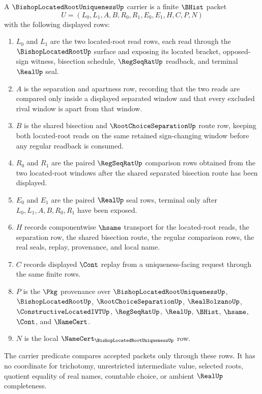 \begin{definition}
\label{def:bishop-located-root-uniqueness-carrier}
A $\BishopLocatedRootUniquenessUp$ carrier is a finite $\BHist$ packet
$$
U=(L_0,L_1,A,B,R_0,R_1,E_0,E_1,H,C,P,N)
$$
with the following displayed rows:
\begin{enumerate}
\item $L_0$ and $L_1$ are the two located-root read rows, each read through the $\BishopLocatedRootUp$ surface and exposing its located bracket, opposed-sign witness, bisection schedule, $\RegSeqRatUp$ readback, and terminal $\RealUp$ seal.
\item $A$ is the separation and apartness row, recording that the two reads are compared only inside a displayed separated window and that every excluded rival window is apart from that window.
\item $B$ is the shared bisection and $\RootChoiceSeparationUp$ route row, keeping both located-root reads on the same retained sign-changing window before any regular readback is consumed.
\item $R_0$ and $R_1$ are the paired $\RegSeqRatUp$ comparison rows obtained from the two located-root windows after the shared separated bisection route has been displayed.
\item $E_0$ and $E_1$ are the paired $\RealUp$ seal rows, terminal only after $L_0,L_1,A,B,R_0,R_1$ have been exposed.
\item $H$ records componentwise $\hsame$ transport for the located-root reads, the separation row, the shared bisection route, the regular comparison rows, the real seals, replay, provenance, and local name.
\item $C$ records displayed $\Cont$ replay from a uniqueness-facing request through the same finite rows.
\item $P$ is the $\Pkg$ provenance over $\BishopLocatedRootUniquenessUp$, $\BishopLocatedRootUp$, $\RootChoiceSeparationUp$, $\RealBolzanoUp$, $\ConstructiveLocatedIVTUp$, $\RegSeqRatUp$, $\RealUp$, $\BHist$, $\hsame$, $\Cont$, and $\NameCert$.
\item $N$ is the local $\NameCert_{\BishopLocatedRootUniquenessUp}$ row.
\end{enumerate}
The carrier predicate compares accepted packets only through these rows. It has no coordinate for trichotomy, unrestricted intermediate value, selected roots, quotient equality of real names, countable choice, or ambient $\RealUp$ completeness.
\end{definition}

